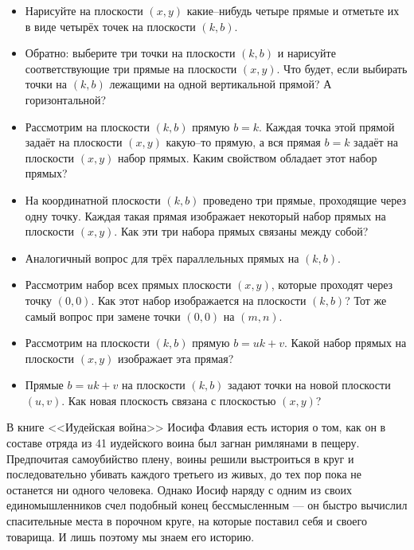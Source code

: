 \documentclass[10pt]{scrbook} \usepackage{modules/nonstahp_book}
\begin{document}
\begin{itemize}
\item Нарисуйте на плоскости $(x,y)$ какие--нибудь четыре прямые и отметьте их в виде четырёх точек на плоскости $(k,b)$. 
\item Обратно: выберите три точки на плоскости $(k,b)$ и нарисуйте соответствующие три прямые на плоскости $(x,y)$. Что будет, если выбирать точки на $(k,b)$ лежащими на одной вертикальной прямой? А горизонтальной?
\item Рассмотрим на плоскости $(k,b)$ прямую $b=k$. Каждая точка этой прямой задаёт на плоскости $(x,y)$ какую--то прямую, а вся прямая $b=k$ задаёт на плоскости $(x,y)$ набор прямых. Каким свойством обладает этот набор прямых?
\item На координатной плоскости $(k,b)$ проведено три прямые, проходящие через одну точку. Каждая такая прямая изображает некоторый набор прямых на плоскости $(x,y)$. Как эти три набора прямых связаны между собой?
\item Аналогичный вопрос для трёх параллельных прямых на $(k,b)$.
\item Рассмотрим набор всех прямых плоскости $(x,y)$, которые проходят через точку $(0,0)$. Как этот набор изображается на плоскости $(k,b)$? Тот же самый вопрос при замене точки $(0,0)$ на $(m,n)$.
\item Рассмотрим на плоскости $(k,b)$ прямую $b = uk + v$. Какой набор прямых на плоскости $(x,y)$ изображает эта прямая? 
\item Прямые $b = uk + v$ на плоскости $(k,b)$ задают точки на новой плоскости $(u,v)$. Как новая плоскость связана с плоскостью $(x,y)$?
\end{itemize}


В книге <<Иудейская война>> Иосифа Флавия есть история о том, как он в составе отряда из 41 иудейского воина был загнан римлянами в пещеру. Предпочитая самоубийство плену, воины решили выстроиться в круг и последовательно убивать каждого третьего из живых, до тех пор пока не останется ни одного человека. Однако Иосиф наряду с одним из своих единомышленников счел подобный конец бессмысленным --- он быстро вычислил спасительные места в порочном круге, на которые поставил себя и своего товарища. И лишь поэтому мы знаем его историю.
\end{document}

